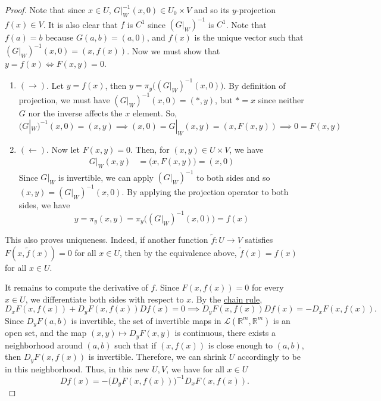 \begin{proof}
		Note that since $x \in U$, $G|_W^{-1} (x, 0) \in U_0 \times V$ and so its $y$-projection $f(x) \in V$. It is also clear that $f$ is $C^1$ since $(G|_W)^{-1}$ is $C^1$. Note that $f(a) = b$ because $G(a,b) = (a,0)$, and $f(x)$ is the unique vector such that $(G|_W)^{-1}(x,0) = (x,f(x))$. Now we must show that $y = f(x) \iff F(x, y) = 0$. 
		\begin{enumerate}
			\item $(\rightarrow)$. Let $y = f(x)$, then $y = \pi_y \big( (G|_W)^{-1} (x, 0)\big)$. By definition of projection, we must have $(G|_W)^{-1} (x, 0) = (\ast, y)$, but $\ast = x$ since neither $G$ nor the inverse affects the $x$ element. So, 
				\begin{equation}
					(G|_W)^{-1} (x, 0) = (x, y) \implies (x, 0) = G|_W (x, y) = (x, F(x, y)) \implies 0 = F(x, y)
				\end{equation}

			\item $(\leftarrow)$. Now let $F(x, y) = 0$. Then, for $(x, y) \in U \times V$, we have 
				\begin{align}
					G|_W (x, y) & = \big( x, F(x, y) \big) = (x, 0)
				\end{align}
				Since $G|_W$ is invertible, we can apply $(G|_W)^{-1}$ to both sides and so $(x, y) = (G|_W)^{-1} (x, 0)$. By applying the projection operator to both sides, we have 
				\begin{equation}
				  y = \pi_y (x, y) = \pi_y \big( (G|_W)^{-1} (x, 0) \big) = f(x)
				\end{equation}
		\end{enumerate}

		This also proves uniqueness. Indeed, if another function
		$\widetilde f: U \to V$ satisfies $F(x,\widetilde f(x)) = 0$ for all $x \in U$, then by the equivalence above, $\widetilde f(x) = f(x)$ for all $x \in U$.

		It remains to compute the derivative of $f$. Since $F(x,f(x)) = 0$ for every $x \in U$, we differentiate both sides with respect to $x$. By the \hyperref[thm:chain-rule]{chain rule},
		\begin{equation}
			D_xF(x,f(x)) + D_yF(x,f(x))Df(x) = 0 \implies D_yF(x,f(x))Df(x) = -D_xF(x,f(x)).
		\end{equation}
		Since $D_yF(a,b)$ is invertible, the set of invertible maps in $\mathcal{L}(\mathbb{R}^{m}, \mathbb{R}^{m})$ is an open set, and the map $(x, y) \mapsto D_y F(x, y)$ is continuous, there exists a neighborhood around $(a, b)$ such that if $(x, f(x))$ is close enough to $(a, b)$, then $D_y F(x, f(x))$ is invertible. Therefore, we can shrink $U$ accordingly to be in this neighborhood. Thus, in this new $U, V$, we have for all $x \in U$
		\begin{equation}
			Df(x) = - \big( D_yF(x,f(x)) \big)^{-1} D_x F(x,f(x)).
		\end{equation}
	\end{proof}

